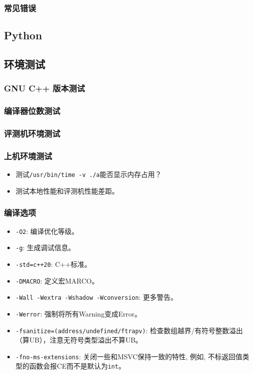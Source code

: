 \documentclass[a4paper, twoside]{article}
\begin{document}
        \subsubsection{常见错误}

    \subsection{Python}

    \subsection{环境测试}
        \subsubsection{GNU C++ 版本测试}

        \subsubsection{编译器位数测试}

        \subsubsection{评测机环境测试}

        \subsubsection{上机环境测试}
        \begin{itemize}
            \item 测试\texttt{/usr/bin/time -v ./a}能否显示内存占用？
            \item 测试本地性能和评测机性能差距。
        \end{itemize}
    
        \subsubsection{编译选项}
        \begin{itemize}
            \item \texttt{-O2}: 编译优化等级。
            \item \texttt{-g}: 生成调试信息。
            \item \texttt{-std=c++20}: C++标准。
            \item \texttt{-DMACRO}: 定义宏MARCO。
            \item \texttt{-Wall -Wextra -Wshadow -Wconversion}: 更多警告。
            \item \texttt{-Werror}: 强制将所有Warning变成Error。
            \item \texttt{-fsanitize=(address/undefined/ftrapv)}: 检查数组越界/有符号整数溢出（算UB），注意无符号类型溢出不算UB。
            \item \texttt{-fno-ms-extensions}: 关闭一些和MSVC保持一致的特性, 例如, 不标返回值类型的函数会报CE而不是默认为\texttt{int}。
        \end{itemize}
\end{document}
